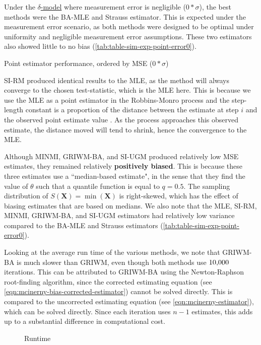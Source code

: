 Under the \hyperref[model: no-measurement-error]{$\delta$-model} where measurement error is negligible ($0*\sigma$), the best methods were the BA-MLE and Strauss estimator. This is expected under the measurement error scenario, as both methods were designed to be optimal under uniformity and negligible measurement error assumptions. These two estimators also showed little to no bias (\autoref{tab:table-sim-exp-point-error0}). 
\begin{table}[ht]
    \centering
    \caption{Point estimator performance, ordered by MSE ($0*\sigma$)}
    
    \label{tab:table-sim-exp-point-error0}
\end{table}

SI-RM produced identical results to the MLE, as the method will always converge to the chosen test-statistic, which is the MLE here. This is because we use the MLE as a point estimator in the Robbins-Monro process and the step-length constant is a proportion of the distance between the estimate at step $i$ and the observed point estimate value \cite{Garthwaite1992}. As the process approaches this observed estimate, the distance moved will tend to shrink, hence the convergence to the MLE.

Although MINMI, GRIWM-BA, and SI-UGM produced relatively low MSE estimates, they remained relatively \textbf{positively biased}. This is because these three estimates use a ``median-based estimate", in the sense that they find the value of $\theta$ such that a quantile function is equal to $q = 0.5$. The sampling distribution of $S(\bm{X}) = \min(\bm{X})$ is right-skewed, which has the effect of biasing estimates that are based on medians. We also note that the MLE, SI-RM, MINMI, GRIWM-BA, and SI-UGM estimators had relatively low variance compared to the BA-MLE and Strauss estimators (\autoref{tab:table-sim-exp-point-error0}).

Looking at the average run time of the various methods, we note that GRIWM-BA is much slower than GRIWM, even though both methods use $10{\small,}000$ iterations. This can be attributed to GRIWM-BA using the Newton-Raphson root-finding algorithm, since the corrected \citet{Mcinerny2006} estimating equation (see \autoref{eqn:mcinerny-bias-corrected-estimator}) cannot be solved directly. This is compared to the uncorrected estimating equation (see \autoref{eqn:mcinerny-estimator}), which can be solved directly. Since each iteration uses $n-1$ \citet{Mcinerny2006} estimates, this adds up to a substantial difference in computational cost.
\begin{figure}[ht]
    \centering
    
    \caption{Runtime}
    \label{fig:sim-exp-runtime-chart}
\end{figure}

